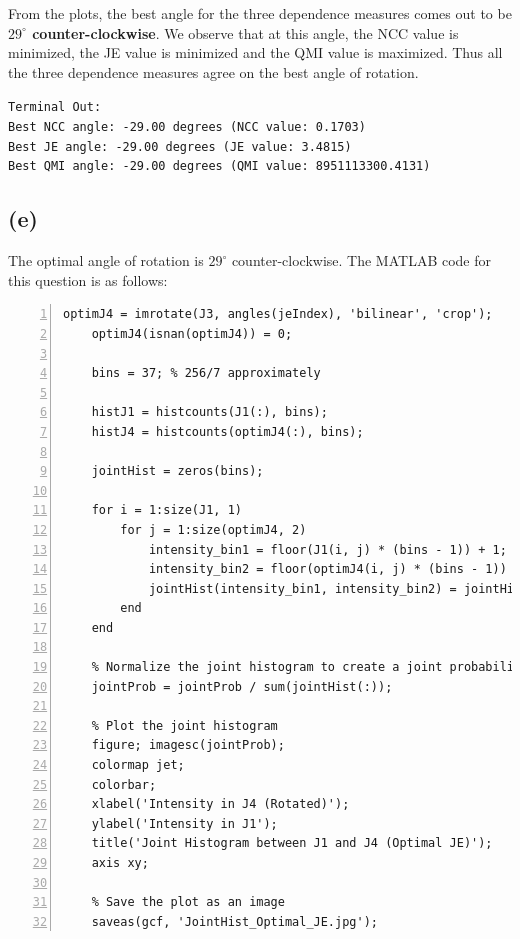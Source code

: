 \documentclass{article}
\begin{document}
From the plots, the best angle for the three dependence measures comes out to be \textbf{$29^{\circ}$ counter-clockwise}. We observe that at this angle, the NCC value is minimized, the JE value is minimized and the QMI value is maximized.
Thus all the three dependence measures agree on the best angle of rotation.

\vspace{5pt}
\texttt{Terminal Out:\\Best NCC angle: -29.00 degrees (NCC value: 0.1703)\\
Best JE angle: -29.00 degrees (JE value: 3.4815)\\
Best QMI angle: -29.00 degrees (QMI value: 8951113300.4131)}

\newpage
\subsection*{(e)}

The optimal angle of rotation is $29^{\circ}$ counter-clockwise. The MATLAB code for this question is as follows:
\begin{lstlisting}[frame=single,numbers=left,style=Matlab-Pyglike,breaklines=true,postbreak=\mbox{\textcolor{red}{$\hookrightarrow$}\space}]
    optimJ4 = imrotate(J3, angles(jeIndex), 'bilinear', 'crop');
    optimJ4(isnan(optimJ4)) = 0;
    
    bins = 37; % 256/7 approximately
    
    histJ1 = histcounts(J1(:), bins);
    histJ4 = histcounts(optimJ4(:), bins);
    
    jointHist = zeros(bins);
    
    for i = 1:size(J1, 1)
        for j = 1:size(optimJ4, 2)
            intensity_bin1 = floor(J1(i, j) * (bins - 1)) + 1;
            intensity_bin2 = floor(optimJ4(i, j) * (bins - 1)) + 1;
            jointHist(intensity_bin1, intensity_bin2) = jointHist(intensity_bin1, intensity_bin2) + 1;
        end
    end
    
    % Normalize the joint histogram to create a joint probability distribution
    jointProb = jointProb / sum(jointHist(:));
    
    % Plot the joint histogram
    figure; imagesc(jointProb);
    colormap jet;
    colorbar;
    xlabel('Intensity in J4 (Rotated)');
    ylabel('Intensity in J1');
    title('Joint Histogram between J1 and J4 (Optimal JE)');
    axis xy;
     
    % Save the plot as an image
    saveas(gcf, 'JointHist_Optimal_JE.jpg');
\end{lstlisting}
\end{document}
